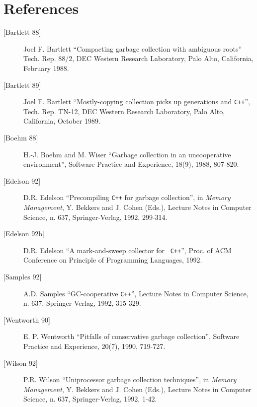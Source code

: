 \section{References}
\begin{description}
\item [{[Bartlett 88]}] Joel F. Bartlett ``Compacting garbage collection with
  ambiguous roots'' Tech. Rep.  88/2, DEC Western Research Laboratory, Palo
  Alto, California, February 1988.
\item [{[Bartlett 89]}] Joel F. Bartlett ``Mostly-copying collection picks up
  generations and {\tt C++}'', Tech.  Rep.  TN-12, DEC Western Research
  Laboratory, Palo Alto, California, October 1989.
\item [{[Boehm 88]}] H.-J. Boehm and M. Wiser ``Garbage collection in an
  uncooperative environment'', Software Practice and Experience, 18(9), 1988,
  807-820.
\item [{[Edelson 92]}] D.R. Edelson ``Precompiling {\tt C++} for garbage
  collection'', in {\em Memory Management}, Y. Bekkers and J. Cohen (Eds.),
  Lecture Notes in Computer Science, n. 637, Springer-Verlag, 1992, 299-314.
\item [{[Edelson 92b]}] D.R. Edelson ``A mark-and-sweep collector for {\tt
    C++}'', Proc. of ACM Conference on Principle of Programming Languages,
  1992.
\item [{[Samples 92]}] A.D. Samples ``GC-cooperative {\tt C++}'', Lecture
  Notes in Computer Science, n. 637, Springer-Verlag, 1992, 315-329.
\item [{[Wentworth 90]}] E. P. Wentworth ``Pitfalls of conservative garbage
  collection'', Software Practice and Experience, 20(7), 1990, 719-727.
\item [{[Wilson 92]}] P.R. Wilson ``Uniprocessor garbage collection
  techniques'', in {\em Memory Management}, Y. Bekkers and J. Cohen (Eds.),
  Lecture Notes in Computer Science, n.  637, Springer-Verlag, 1992, 1-42.
\end{description}


